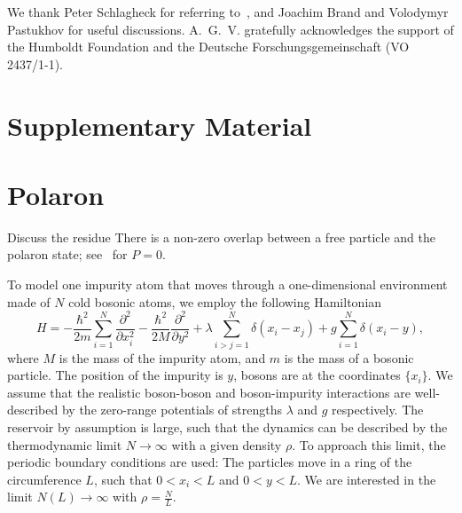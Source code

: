 \documentclass[twocolumn,amsmath,amssymb,showpacs,prl,superscriptaddress,aps]{revtex4-1}
\begin{document}
\begin{acknowledgments}
We thank Peter Schlagheck for referring to~\cite{Schlagheck2005},
and Joachim Brand and Volodymyr Pastukhov for useful discussions.
A.~G.~V. gratefully acknowledges the support of the Humboldt Foundation and the Deutsche Forschungsgemeinschaft
(VO 2437/1-1).
\end{acknowledgments}

\widetext

\section{Supplementary Material}

\section{Polaron}

{\color{blue} Discuss the residue} 
There is a non-zero overlap between a free particle and the polaron state; see~\cite{volosniev2017} for $P=0$.

To model one impurity atom that moves through a one-dimensional environment made of $N$ cold bosonic atoms, we employ the following Hamiltonian
\begin{equation}
H=-\frac{\hbar^2}{2m}\sum_{i=1}^N\frac{\partial^2}{\partial x_i^2}-\frac{\hbar^2}{2M}\frac{\partial^2}{\partial y^2}+\lambda \sum_{i>j=1}^N\delta(x_i-x_j)+g \sum_{i=1}^N \delta(x_i-y),
\end{equation}
where $M$ is the mass of the impurity atom, and $m$ is the mass of a bosonic particle. The position of the impurity is $y$, bosons are at the coordinates $\{x_i\}$. 
We assume that the realistic boson-boson and boson-impurity interactions are well-described by the zero-range potentials of strengths $\lambda$ and $g$ respectively. 
The reservoir by assumption is large, such that the dynamics can be described by the thermodynamic limit $N\to \infty$ with a given density $\rho$.
To approach this limit, the periodic boundary conditions are used: The particles move in a ring of the circumference $L$, such that $0<x_i<L$ and $0<y<L$.
We are interested in the limit $N(L)\to \infty$ with $\rho=\frac{N}{L}$.
\end{document}
